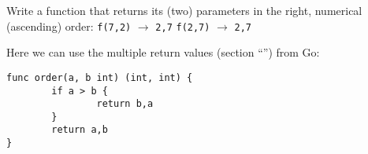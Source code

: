 \begin{Exercise}[title={Integer ordering},difficulty=0]
\label{ex:ordering function}
\Question Write a function that returns its (two) parameters in the right,
numerical (ascending) order:\newline 
\lstinline{f(7,2)} $\rightarrow$ \lstinline{2,7}\newline
\lstinline{f(2,7)} $\rightarrow$ \lstinline{2,7}\newline
\end{Exercise}

\begin{Answer}
\Question 
Here we can use the multiple return values (section ``'')
from Go:
\begin{lstlisting}
func order(a, b int) (int, int) {
        if a > b { 
                return b,a 
        }   
        return a,b 
}
\end{lstlisting}

\end{Answer}
